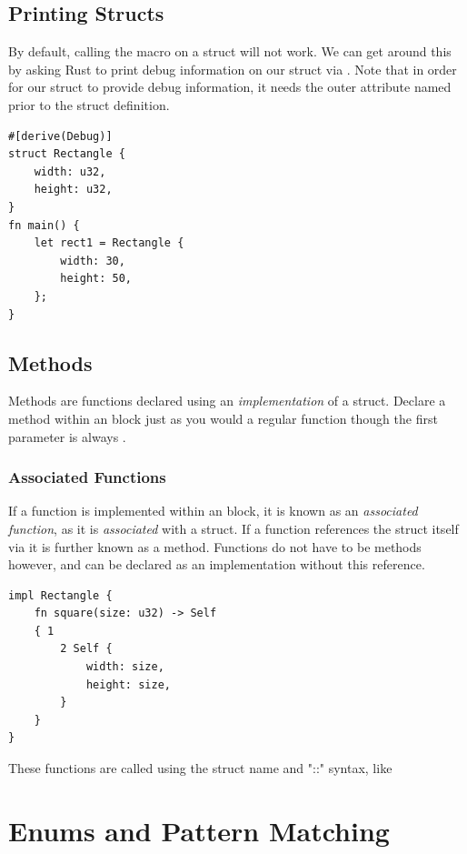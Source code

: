 \documentclass[]{article}
\begin{document}
\subsection{Printing Structs}

By default, calling the  macro on a struct will not work.
We can get around this by asking Rust to print debug information on our struct via .
Note that in order for our struct to provide debug information, it needs the outer attribute  named prior to the struct definition.
\begin{verbatim}
#[derive(Debug)]
struct Rectangle {
    width: u32,
    height: u32,
}
fn main() {
    let rect1 = Rectangle {
        width: 30,
        height: 50,
    };
}
\end{verbatim}
\subsection{Methods}

Methods are functions declared using an \emph{implementation} of a struct.
Declare a method within an  block just as you would a regular function though the first parameter is always .
\subsubsection{Associated Functions}

If a function is implemented within an  block, it is known as an \emph{associated function}, as it is \emph{associated} with a struct.
If a function references the struct itself via  it is further known as a method.
Functions do not have to be methods however, and can be declared as an implementation without this reference.
\begin{verbatim}
impl Rectangle {
    fn square(size: u32) -> Self
    { 1
        2 Self {
            width: size,
            height: size,
        }
    }
}
\end{verbatim}
These functions are called using the struct name and "::" syntax, like 
\section{Enums and Pattern Matching}
\end{document}
